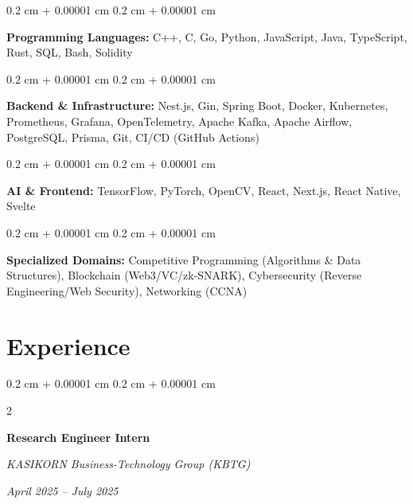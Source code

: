 \documentclass[10pt,letterpaper]{extarticle}
\newenvironment{onecolentry}{
    \begin{adjustwidth}{
        0.2 cm + 0.00001 cm
    }{
        0.2 cm + 0.00001 cm
    }
}{
    \end{adjustwidth}
} %
\newenvironment{twocolentry}[2][]{
    \onecolentry
    \def\secondColumn{#2}
    \setcolumnwidth{\fill, 5.0 cm}
    \begin{paracol}{2}
}{
    \switchcolumn \raggedleft \secondColumn
    \end{paracol}
    \endonecolentry
} %
\begin{document}
        \begin{onecolentry}
            \textbf{Programming Languages:} C++, C, Go, Python, JavaScript, Java, TypeScript, Rust, SQL, Bash, Solidity
        \end{onecolentry}

        \vspace{0.2 cm}

        \begin{onecolentry}
            \textbf{Backend \& Infrastructure:} Nest.js, Gin, Spring Boot, Docker, Kubernetes, Prometheus, Grafana, OpenTelemetry, Apache Kafka, Apache Airflow, PostgreSQL, Prisma, Git, CI/CD (GitHub Actions)
        \end{onecolentry}

        \vspace{0.2 cm}

        \begin{onecolentry}
            \textbf{AI \& Frontend:} TensorFlow, PyTorch, OpenCV, React, Next.js, React Native, Svelte
        \end{onecolentry}

        \vspace{0.2 cm}

        \begin{onecolentry}
            \textbf{Specialized Domains:} Competitive Programming (Algorithms \& Data Structures), Blockchain (Web3/VC/zk-SNARK), Cybersecurity (Reverse Engineering/Web Security), Networking (CCNA)
        \end{onecolentry}

    \section{Experience}

        \begin{twocolentry}{
            \textit{April 2025 – July 2025}}
            \textbf{Research Engineer Intern}

            \textit{KASIKORN Business-Technology Group (KBTG)}
        \end{twocolentry}
\end{document}
